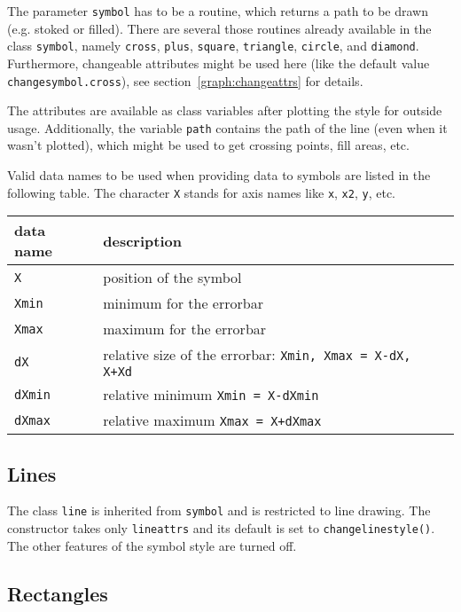 The parameter \verb|symbol| has to be a routine, which returns a path to
be drawn (e.g. stoked or filled). There are several those routines
already available in the class \verb|symbol|, namely \verb|cross|,
\verb|plus|, \verb|square|, \verb|triangle|, \verb|circle|, and
\verb|diamond|. Furthermore, changeable attributes might be used here
(like the default value \verb|changesymbol.cross|), see
section~\ref{graph:changeattrs} for details.

The attributes are available as class variables after plotting the
style for outside usage. Additionally, the variable \verb|path|
contains the path of the line (even when it wasn't plotted), which
might be used to get crossing points, fill areas, etc.

Valid data names to be used when providing data to symbols are listed
in the following table. The character \verb|X| stands for axis names
like \verb|x|, \verb|x2|, \verb|y|, etc.

\begin{center}
\begin{tabular}{ll}
data name&description\\
\hline
\texttt{X}&position of the symbol\\
\texttt{Xmin}&minimum for the errorbar\\
\texttt{Xmax}&maximum for the errorbar\\
\texttt{dX}&relative size of the errorbar: \texttt{Xmin, Xmax = X-dX, X+Xd}\\
\texttt{dXmin}&relative minimum \texttt{Xmin = X-dXmin}\\
\texttt{dXmax}&relative maximum \texttt{Xmax = X+dXmax}\\
\end{tabular}
\end{center}

\subsection{Lines}

The class \verb|line| is inherited from \verb|symbol| and is restricted
to line drawing. The constructor takes only \verb|lineattrs| and its
default is set to \verb|changelinestyle()|. The other features of the
symbol style are turned off.

\subsection{Rectangles}

